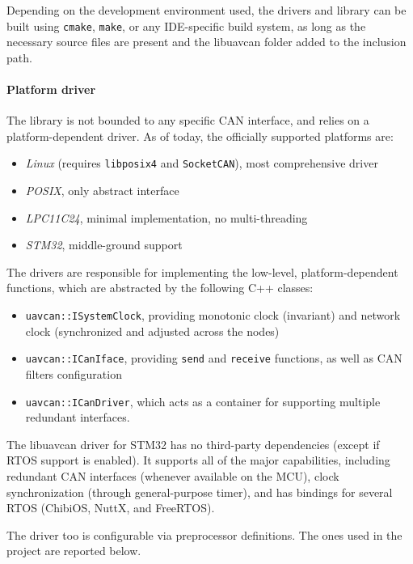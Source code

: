 Depending on the development environment used, the drivers and library can be built using \texttt{cmake}, \texttt{make}, or any IDE-specific build system, as long as the necessary source files are present and the libuavcan  folder added to the inclusion path.


\paragraph{Platform driver}
The library is not bounded to any specific CAN interface, and relies on a platform-dependent driver.
As of today, the officially supported platforms are:
\begin{itemize}
    \item \emph{Linux} (requires \texttt{libposix4} and \texttt{SocketCAN}), most comprehensive driver
    \item \emph{POSIX}, only abstract interface
    \item \emph{LPC11C24}, minimal implementation, no multi-threading
    \item \emph{STM32}, middle-ground support
\end{itemize}

The drivers are responsible for implementing the low-level, platform-dependent functions, which are abstracted by the following C++ classes:
\begin{itemize}
    \item \texttt{uavcan::ISystemClock}, providing monotonic clock (invariant) and network clock (synchronized and adjusted across the nodes)
    \item \texttt{uavcan::ICanIface}, providing \texttt{send} and \texttt{receive} functions, as well as CAN filters configuration
    \item \texttt{uavcan::ICanDriver}, which acts as a container for supporting multiple redundant interfaces.
\end{itemize}

The libuavcan driver for STM32 has no third-party dependencies (except if RTOS support is enabled).
It supports all of the major capabilities, including redundant CAN interfaces (whenever available on the MCU), clock synchronization (through general-purpose timer), and has bindings for several RTOS (ChibiOS, NuttX, and FreeRTOS).

The driver too is configurable via preprocessor definitions.
The ones used in the project are reported below.

